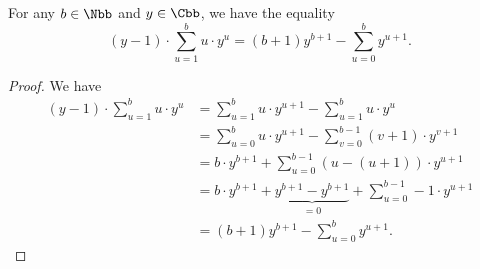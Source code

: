 \begin{lemma}\label{argeo}
For any $b\in\Nbb$ and $y\in\Cbb$, we have the equality
$$(y-1)\cdot\sum_{u=1}^{b}u\cdot y^u=(b+1)y^{b+1}-\sum_{u=0}^b y^{u+1}.$$
\end{lemma}
\begin{proof}
We have 
\begin{align*}
(y-1)\cdot\sum_{u=1}^{b}u\cdot y^u&=\sum_{u=1}^{b}u\cdot y^{u+1}-\sum_{u=1}^{b}u\cdot y^u\\
&=\sum_{u=0}^{b}u\cdot y^{u+1}-\sum_{v=0}^{b-1}(v+1)\cdot y^{v+1}\\
&=b\cdot y^{b+1}+\sum_{u=0}^{b-1}(u-(u+1))\cdot y^{u+1}\\
&=b\cdot y^{b+1}+\underbrace{y^{b+1}-y^{b+1}}_{=0}+\sum_{u=0}^{b-1}-1\cdot y^{u+1}\\
&=(b+1)y^{b+1}-\sum_{u=0}^b y^{u+1}.
\end{align*}
\end{proof}

